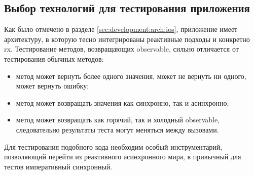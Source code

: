 \subsection{Выбор технологий для тестирования приложения}
\label{sec:testing:tech}

Как было отмечено в разделе \ref{sec:development:arch:ios}, приложение имеет архитектуру, в которую тесно интегрированы реактивные подходы и конкретно \gls{rx}. Тестирование методов, возвращающих \gls{observable}, сильно отличается от тестирования обычных методов:

\begin{itemize}
	\item метод может вернуть более одного значения, может не вернуть ни одного, может вернуть ошибку;
	\item метод может возвращать значения как синхронно, так и асинхронно;
	\item метод может возвращать как горячий, так и холодный \gls{observable}, следовательно результаты теста могут меняться между вызовами.
\end{itemize}

Для тестирования подобного кода необходим особый инструментарий, позволяющий перейти из реактивного асинхронного мира, в привычный для тестов императивный синхронный.

